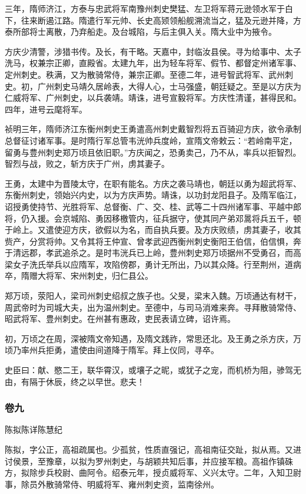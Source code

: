 \documentclass[]{article}
\begin{document}
三年，隋师济江，方泰与忠武将军南豫州刺史樊猛、左卫将军蒋元逊领水军于白下，往来断遏江路。隋遣行军元帅、长史高颎领船舰溯流当之，猛及元逊并降，方泰所部将士离散，乃弃船走。及台城陷，与后主俱入关。隋大业中为掖令。

方庆少清警，涉猎书传。及长，有干略。天嘉中，封临汝县侯。寻为给事中、太子洗马，权兼宗正卿，直殿省。太建九年，出为轻车将军、假节、都督定州诸军事、定州刺史。秩满，又为散骑常侍，兼宗正卿。至德二年，进号智武将军、武州刺史。初，广州刺史马靖久居岭表，大得人心，士马强盛，朝廷疑之。至是以方庆为仁威将军、广州刺史，以兵袭靖。靖诛，进号宣毅将军。方庆性清谨，甚得民和。四年，进号云麾将军。

祯明三年，隋师济江东衡州刺史王勇遣高州刺史戴智烈将五百骑迎方庆，欲令承制总督征讨诸军事。是时隋行军总管韦洸帅兵度岭，宣隋文帝敕云：``若岭南平定，留勇与豊州刺史郑万顷且依旧职。''方庆闻之，恐勇卖己，乃不从，率兵以拒智烈。智烈与战，败之，斩方庆于广州，虏其妻子。

王勇，太建中为晋陵太守，在职有能名。方庆之袭马靖也，朝廷以勇为超武将军、东衡州刺史，领始兴内史，以为方庆声势。靖诛，以功封龙阳县子。及隋军临江，诏授勇使持节、光胜将军、总督衡、广、交、桂、武等二十四州诸军事、平越中郎将，仍入援。会京城陷、勇因移檄管内，征兵据守，使其同产弟邓暠将兵五千，顿于岭上。又遣使迎方庆，欲假以为名，而自执兵要。及方庆败绩，虏其妻子，收其赀产，分赏将帅。又令其将王仲宣、曾孝武迎西衡州刺史衡阳王伯信，伯信惧，奔于清远郡，孝武追杀之。是时韦洸兵已上岭，豊州刺史郑万顷据州不受勇召，而高梁女子洗氏举兵以应隋军，攻陷傍郡，勇计无所出，乃以其众降。行至荆州，道病卒，隋赠大将军、宋州刺史，归仁县公。

郑万顷，荥阳人，梁司州刺史绍叔之族子也。父旻，梁末入魏。万顷通达有材干，周武帝时为司城大夫，出为温州刺史。至德中，与司马消难来奔。寻拜散骑常侍、昭武将军、豊州刺史。在州甚有惠政，吏民表请立碑，诏许焉。

初，万顷之在周，深被隋文帝知遇，及隋文践祚，常思还北。及王勇之杀方庆，万顷乃率州兵拒勇，遣使由间道降于隋军。拜上仪同，寻卒。

史臣曰：献、愍二王，联华霄汉，或壤子之昵，或犹子之宠，而机桥为阻，骖驾无由，有隔于休辰，终之以早世。悲夫！

\hypertarget{header-n4502}{%
\subsubsection{卷九}\label{header-n4502}}

陈拟陈详陈慧纪

陈拟，字公正，高祖疏属也。少孤贫，性质直强记，高祖南征交趾，拟从焉。又进讨侯景，至豫章，以拟为罗州刺史，与胡颖共知后事，并应接军粮。高祖作镇硃方，拟除步兵校尉、曲阿令。绍泰元年，授贞威将军、义兴太守。二年，入知卫尉事，除员外散骑常侍、明威将军、雍州刺史资，监南徐州。
\end{document}

